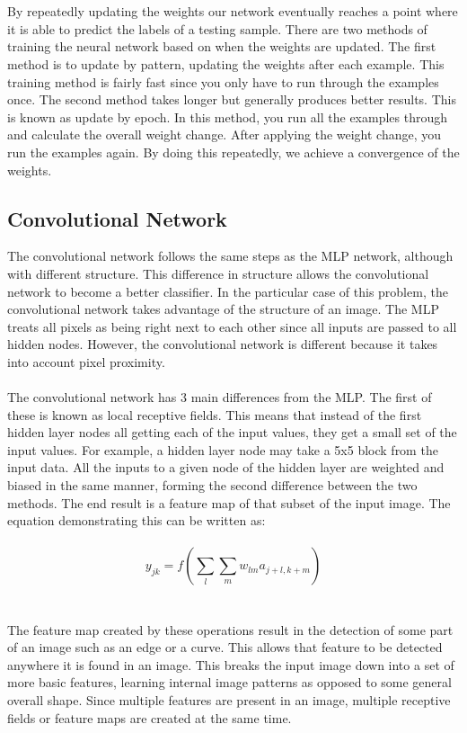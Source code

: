 \documentclass[12pt,twoside]{article} %
\begin{document}
\\\\
By repeatedly updating the weights our network eventually reaches a point where it is able to predict the labels of a testing sample. There are two methods of training the neural network based on when the weights are updated. The first method is to update by pattern, updating the weights after each example. This training method is fairly fast since you only have to run through the examples once. The second method takes longer but generally produces better results. This is known as update by epoch. In this method, you run all the examples through and calculate the overall weight change. After applying the weight change, you run the examples again. By doing this repeatedly, we achieve a convergence of the weights.
\subsection{Convolutional Network}
The convolutional network follows the same steps as the MLP network, although with different structure. This difference in structure allows the convolutional network to become a better classifier. In the particular case of this problem, the convolutional network takes advantage of the structure of an image. The MLP treats all pixels as being right next to each other since all inputs are passed to all hidden nodes. However, the convolutional network is different because it takes into account pixel proximity. 
\\\\
The convolutional network has 3 main differences from the MLP. The first of these is known as local receptive fields. This means that instead of the first hidden layer nodes all getting each of the input values, they get a small set of the input values. For example, a hidden layer node may take a 5x5 block from the input data. All the inputs to a given node of the hidden layer are weighted and biased in the same manner, forming the second difference between the two methods. The end result is a feature map of that subset of the input image. The equation demonstrating this can be written as:
\\\\
$$y_{jk} = f(\sum_{l}\sum_{m}w_{lm}a_{j+l, k+m})$$
\\\\
The feature map created by these operations result in the detection of some part of an image such as an edge or a curve. This allows that feature to be detected anywhere it is found in an image. This breaks the input image down into a set of more basic features, learning internal image patterns as opposed to some general overall shape. Since multiple features are present in an image, multiple receptive fields or feature maps are created at the same time.
\end{document}
